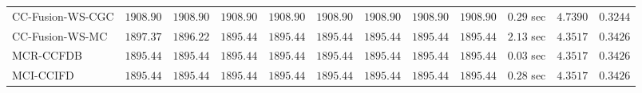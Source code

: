 \begin{table}[H]
\begin{tabular}{lrrrrrrrrrrr}
    CC-Fusion-WS-CGC & $      1908.90$ & $      1908.90$ & $      1908.90$ & $      1908.90$ & $      1908.90$ & $      1908.90$ & $      1908.90$ & $      1908.90$ & $         0.29$ sec    & $       4.7390$  & $       0.3244$ \\ 
     CC-Fusion-WS-MC & $      1897.37$ & $      1896.22$ & $      1895.44$ & $      1895.44$ & $      1895.44$ & $      1895.44$ & $      1895.44$ & $      1895.44$ & $         2.13$ sec    & $       4.3517$  & $       0.3426$ \\ 
\cmidrule{1-1} 
           MCR-CCFDB & $      1895.44$ & $      1895.44$ & $      1895.44$ & $      1895.44$ & $      1895.44$ & $      1895.44$ & $      1895.44$ & $      1895.44$ & $         0.03$ sec    & $       4.3517$  & $       0.3426$ \\ 
\cmidrule{1-1} 
           MCI-CCIFD & $      1895.44$ & $      1895.44$ & $      1895.44$ & $      1895.44$ & $      1895.44$ & $      1895.44$ & $      1895.44$ & $      1895.44$ & $         0.28$ sec    & $       4.3517$  & $       0.3426$ \\ 
\bottomrule
\end{tabular}
\end{table}

